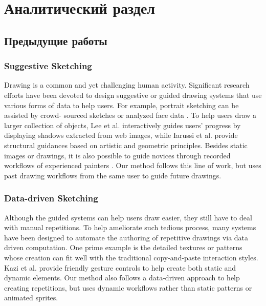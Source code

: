 \chapter{Аналитический раздел}
\label{cha:analysis}
%
%
\section{Предыдущие работы}
\subsection{Suggestive Sketching}
Drawing is a common and yet challenging human activity. Significant research efforts have been devoted to design suggestive or guided drawing systems that use various forms of data to help users. For example, portrait sketching can be assisted by crowd- sourced sketches \cite{bib1} or analyzed face data \cite{bib1}. To help users draw a larger collection of objects, Lee et al. \cite{bib1} interactively guides users’ progress by displaying shadows extracted from web images, while Iarussi et al. \cite{bib1} provide structural guidances based on artistic and geometric principles. Besides static images or drawings, it is also possible to guide novices through recorded workflows of experienced painters \cite{bib1}.
Our method follows this line of work, but uses past drawing workflows from the same user to guide future drawings.

\subsection{Data-driven Sketching}
Although the guided systems can help users draw easier, they still have to deal with manual repetitions. To help ameliorate such tedious process, many systems have been designed to automate the authoring of repetitive drawings via data driven computation. One prime example is the detailed textures or patterns  \cite{bib1} \cite{bib1} \cite{bib1} \cite{bib1} whose creation can fit well with the traditional copy-and-paste interaction styles. Kazi et al.  \cite{bib1} \cite{bib1} provide friendly gesture controls to help create both static and dynamic elements.
Our method also follows a data-driven approach to help creating repetitions, but uses dynamic workflows rather than static patterns or animated sprites.

